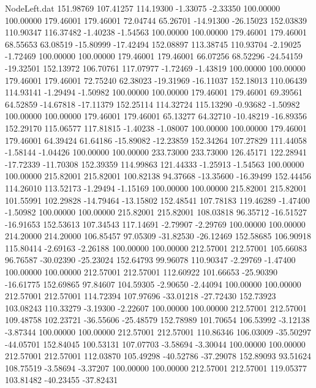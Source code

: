 \begin{filecontents}{NodeLeft.dat}
 151.98769  107.41257  114.19300    -1.33075   -2.33350  100.00000  100.00000  179.46001  179.46001   72.04744   65.26701  -14.91300  -26.15023
 152.03839  110.90347  116.37482    -1.40238   -1.54563  100.00000  100.00000  179.46001  179.46001   68.55653   63.08519  -15.80999  -17.42494
 152.08897  113.38745  110.93704    -2.19025   -1.72469  100.00000  100.00000  179.46001  179.46001   66.07256   68.52296  -24.54159  -19.32501
 152.13972  106.70761  117.07977    -1.72469   -1.43819  100.00000  100.00000  179.46001  179.46001   72.75240   62.38023  -19.31969  -16.11037
 152.18013  110.06439  114.93141    -1.29494   -1.50982  100.00000  100.00000  179.46001  179.46001   69.39561   64.52859  -14.67818  -17.11379
 152.25114  114.32724  115.13290    -0.93682   -1.50982  100.00000  100.00000  179.46001  179.46001   65.13277   64.32710  -10.48219  -16.89356
 152.29170  115.06577  117.81815    -1.40238   -1.08007  100.00000  100.00000  179.46001  179.46001   64.39424   61.64186  -15.89082  -12.23859
 152.34264  107.27829  111.44058    -1.58144   -1.04426  100.00000  100.00000  233.73000  233.73000  126.45171  122.28941  -17.72339  -11.70308
 152.39359  114.99863  121.44333    -1.25913   -1.54563  100.00000  100.00000  215.82001  215.82001  100.82138   94.37668  -13.35600  -16.39499
 152.44456  114.26010  113.52173    -1.29494   -1.15169  100.00000  100.00000  215.82001  215.82001  101.55991  102.29828  -14.79464  -13.15802
 152.48541  107.78183  119.46289    -1.47400   -1.50982  100.00000  100.00000  215.82001  215.82001  108.03818   96.35712  -16.51527  -16.91653
 152.53613  107.34543  117.14691    -2.79907   -2.29769  100.00000  100.00000  214.20000  214.20000  106.85457   97.05309  -31.82530  -26.12469
 152.58685  106.90918  115.80414    -2.69163   -2.26188  100.00000  100.00000  212.57001  212.57001  105.66083   96.76587  -30.02390  -25.23024
 152.64793   99.96078  110.90347    -2.29769   -1.47400  100.00000  100.00000  212.57001  212.57001  112.60922  101.66653  -25.90390  -16.61775
 152.69865   97.84607  104.59305    -2.90650   -2.44094  100.00000  100.00000  212.57001  212.57001  114.72394  107.97696  -33.01218  -27.72430
 152.73923  103.08243  110.33279    -3.19300   -2.22607  100.00000  100.00000  212.57001  212.57001  109.48758  102.23721  -36.55606  -25.48579
 152.78989  101.70654  106.53992    -3.12138   -3.87344  100.00000  100.00000  212.57001  212.57001  110.86346  106.03009  -35.50297  -44.05701
 152.84045  100.53131  107.07703    -3.58694   -3.30044  100.00000  100.00000  212.57001  212.57001  112.03870  105.49298  -40.52786  -37.29078
 152.89093   93.51624  108.75519    -3.58694   -3.37207  100.00000  100.00000  212.57001  212.57001  119.05377  103.81482  -40.23455  -37.82431

\end{filecontents}
